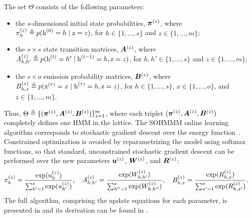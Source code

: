 The set $\Theta$ consists of the following parameters:
\begin{itemize}
	\item the $s$-dimensional initial state probabilities, ${\bm{\pi}}^{(z)}$, where ${\pi}_h^{(z)} \triangleq p({\textnormal{h}}^{(0)}=h \mid {\textnormal{z}}=z)$, for $h \in \{1,\dots,s\}$ and $z \in \{1,\dots,m\}$;
	\item the $s \times s$ state transition matrices, ${\bm{A}}^{(z)}$, where ${A}^{(z)}_{h,h'} \triangleq p({\textnormal{h}}^{(t)}=h' \mid {\textnormal{h}}^{(t-1)}=h, {\textnormal{z}}=z)$, for $h,h' \in \{1,\dots,s\}$ and $z \in \{1,\dots,m\}$;
	\item the $s \times o$ emission probability matrices, ${\bm{B}}^{(z)}$, where ${B}^{(z)}_{h,x} \triangleq p({\textnormal{x}}^{(\tau)}=x \mid {\textnormal{h}}^{(\tau)}=h, {\textnormal{z}}=z)$, for $h \in \{1,\dots,s\}$, $x \in \{1,\dots,o\}$, and $z \in \{1,\dots,m\}$.
\end{itemize}
Thus, $\Theta \triangleq \{({\bm{\pi}}^{(z)}, {\bm{A}}^{(z)}, {\bm{B}}^{(z)})\}_{z=1}^m$, where each triplet $({\bm{\pi}}^{(z)}, {\bm{A}}^{(z)}, {\bm{B}}^{(z)})$ completely defines one HMM in the lattice. The SOHMMM online learning algorithm corresponds to stochastic gradient descent over the energy function~. Constrained optimization is avoided by reparametrizing the model using softmax functions, so that standard, unconstrained stochastic gradient descent can be performed over the new parameters ${\bm{u}}^{(z)}$, ${\bm{W}}^{(z)}$, and ${\bm{R}}^{(z)}$:
\begin{equation}
{\pi}_h^{(z)} = \frac{\exp({u}_h^{(z)})}{\sum_{h'=1}^{s}\exp({u}_{h'}^{(z)})}, \quad
{A}^{(z)}_{h,h'} = \frac{\exp({W}^{(z)}_{h,h'})}{\sum_{h''=1}^{s} \exp({W}^{(z)}_{h,h''})}, \quad
{B}^{(z)}_{h,x} = \frac{\exp({R}^{(z)}_{h,x})}{\sum_{x'=1}^{o} \exp({R}^{(z)}_{h,x'})}.
\end{equation}
The full algorithm, comprising the update equations for each parameter, is presented in  and its derivation can be found in \citet{Ferles2008}.


